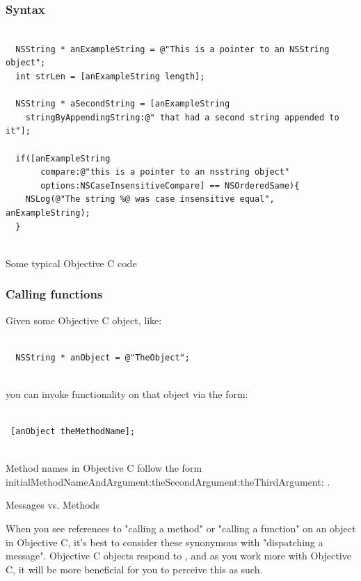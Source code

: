 \documentclass[10pt]{beamer}
\begin{document}
    
\begin{frame}[fragile]
  \frametitle{Syntax}
  \begin{listing}[H]
    \begin{verbatim}
  
  NSString * anExampleString = @"This is a pointer to an NSString object";
  int strLen = [anExampleString length];
  
  NSString * aSecondString = [anExampleString
    stringByAppendingString:@" that had a second string appended to it"];
  
  if([anExampleString
       compare:@"this is a pointer to an nsstring object"
       options:NSCaseInsensitiveCompare] == NSOrderedSame){
    NSLog(@"The string %@ was case insensitive equal", anExampleString);
  }
            
  \end{verbatim}
    \caption{Some typical Objective C code}
    \label{listing:4}
  \end{listing}

\end{frame}

    
\begin{frame}[fragile]
  \frametitle{Calling functions}
  Given some Objective C object, like:
\begin{verbatim}
  
  NSString * anObject = @"TheObject";
            
  \end{verbatim}

you can invoke functionality on that object via the form:
\begin{verbatim}
 
 [anObject theMethodName];
           
 \end{verbatim}

Method names in Objective C follow the form initialMethodNameAndArgument:theSecondArgument:theThirdArgument: .
\begin{block}{Messages vs. Methods}
  
  When you see references to "calling a method" or "calling a function" on an object in Objective C, it's best to
  consider these synonymous with "dispatching a message".  Objective C objects respond to
  , and as you work more with Objective C, it will be more beneficial for
  you to perceive this as such.
            
  \end{block}

\end{frame}
\end{document}
